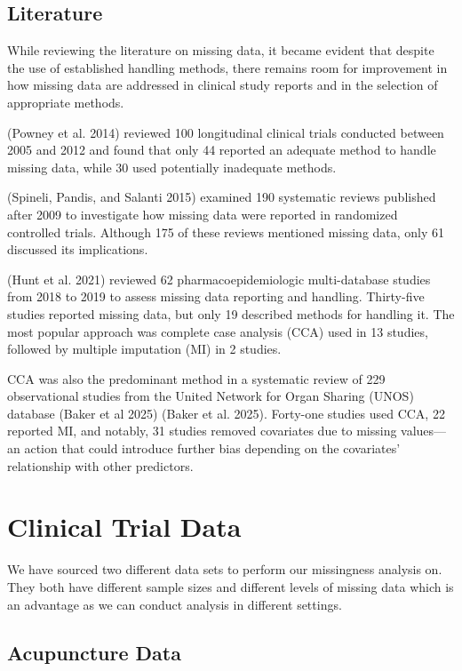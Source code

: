 \documentclass{article}
\begin{document}
\subsection{Literature}\label{literature}

While reviewing the literature on missing data, it became evident that
despite the use of established handling methods, there remains room for
improvement in how missing data are addressed in clinical study reports
and in the selection of appropriate methods.

(Powney et al. 2014) reviewed 100 longitudinal clinical trials conducted
between 2005 and 2012 and found that only 44 reported an adequate method
to handle missing data, while 30 used potentially inadequate methods.

(Spineli, Pandis, and Salanti 2015) examined 190 systematic reviews
published after 2009 to investigate how missing data were reported in
randomized controlled trials. Although 175 of these reviews mentioned
missing data, only 61 discussed its implications.

(Hunt et al. 2021) reviewed 62 pharmacoepidemiologic multi-database
studies from 2018 to 2019 to assess missing data reporting and handling.
Thirty-five studies reported missing data, but only 19 described methods
for handling it. The most popular approach was complete case analysis
(CCA) used in 13 studies, followed by multiple imputation (MI) in 2
studies.

CCA was also the predominant method in a systematic review of 229
observational studies from the United Network for Organ Sharing (UNOS)
database (Baker et al 2025) (Baker et al. 2025). Forty-one studies used
CCA, 22 reported MI, and notably, 31 studies removed covariates due to
missing values---an action that could introduce further bias depending
on the covariates' relationship with other predictors.

\section{Clinical Trial Data}\label{clinical-trial-data}

We have sourced two different data sets to perform our missingness
analysis on. They both have different sample sizes and different levels
of missing data which is an advantage as we can conduct analysis in
different settings.

\subsection{Acupuncture Data}\label{acupuncture-data}
\end{document}
